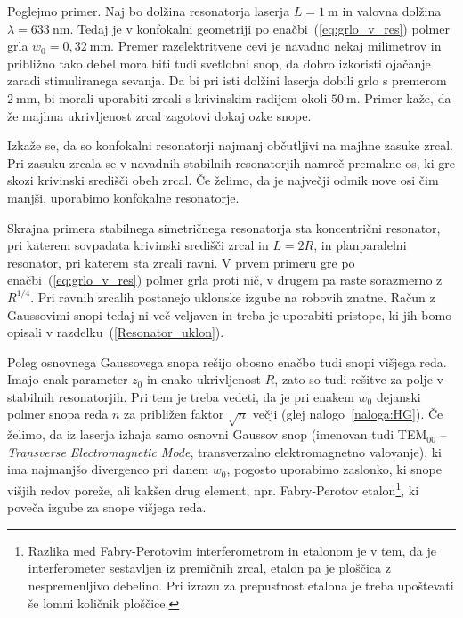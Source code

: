 Poglejmo primer. Naj bo dolžina resonatorja laserja $L=1~\si{\metre}$ in valovna
dolžina $\lambda = 633~\si{\nano\metre}$. Tedaj je v konfokalni geometriji po enačbi~(\ref{eq:grlo_v_res})
polmer grla $w_{0}=0,32~\si{\milli\metre}$. Premer razelektritvene cevi je navadno
nekaj milimetrov in približno tako debel mora biti tudi svetlobni
snop, da dobro izkoristi ojačanje zaradi stimuliranega sevanja.
Da bi pri isti dolžini laserja dobili grlo s premerom $2~\si{\milli\metre}$, bi morali
uporabiti zrcali s krivinskim radijem okoli $50~\si{\metre}$. 
Primer kaže, da že majhna ukrivljenost zrcal zagotovi dokaj ozke snope.

\begin{remark}
Izkaže se, da so konfokalni resonatorji najmanj občutljivi na majhne zasuke zrcal. 
Pri zasuku zrcala se v navadnih stabilnih resonatorjih namreč premakne os, ki gre skozi 
krivinski središči obeh zrcal. Če želimo, da je največji odmik nove osi čim
manjši, uporabimo konfokalne resonatorje. 
\end{remark}

Skrajna primera stabilnega simetričnega resonatorja sta 
koncentrični resonator,
pri katerem sovpadata krivinski središči zrcal in $L=2R$, in planparalelni 
resonator, pri katerem sta zrcali ravni.
V prvem primeru gre po enačbi~(\ref{eq:grlo_v_res}) polmer grla proti nič, v drugem pa raste sorazmerno
z $R^{1/4}$. Pri ravnih zrcalih postanejo uklonske
izgube na robovih znatne. Račun z Gaussovimi snopi tedaj ni več veljaven
in treba je uporabiti pristope, ki jih bomo opisali
v razdelku~(\ref{Resonator_uklon}).

Poleg osnovnega Gaussovega snopa rešijo obosno enačbo tudi snopi višjega reda. 
Imajo enak parameter $z_{0}$ in enako ukrivljenost $R$, zato so tudi 
rešitve za polje v stabilnih
resonatorjih. Pri tem je treba vedeti, da je pri enakem $w_{0}$
dejanski polmer snopa reda $n$ za približen faktor $\sqrt{n}$ večji 
(glej nalogo~\ref{naloga:HG}). Če želimo, da iz laserja izhaja samo 
osnovni Gaussov snop (imenovan tudi TEM$_{00}$ -- {\it Transverse Electromagnetic Mode}, 
transverzalno elektromagnetno valovanje), ki ima najmanjšo 
divergenco pri danem $w_0$, pogosto uporabimo zaslonko, ki snope višjih redov poreže, 
ali kakšen drug element, npr. Fabry-Perotov etalon\footnote{Razlika med Fabry-Perotovim
interferometrom in etalonom je v tem, da je interferometer sestavljen iz premičnih 
zrcal, etalon pa je ploščica z nespremenljivo debelino. Pri izrazu za prepustnost etalona
je treba upoštevati še lomni količnik ploščice.}, ki poveča izgube za snope višjega reda.
 
